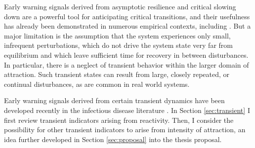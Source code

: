 Early warning signals derived from asymptotic resilience and critical slowing down are a powerful tool for anticipating critical transitions, and their usefulness has already been demonstrated in numerous empirical contexts, including . But a major limitation is the assumption that the system experiences only small, infrequent perturbations, which do not drive the system state very far from equilibrium and which leave sufficient time for recovery in between disturbances. In particular, there is a neglect of transient behavior within the larger domain of attraction. Such transient states can result from large, closely repeated, or continual disturbances, as are common in real world systems.  

Early warning signals derived from certain transient dynamics have been developed recently in the infectious disease literature \cite{oreganTransientIndicatorsTipping2020}. In Section \ref{sec:transient} I first review transient indicators arising from reactivity. Then, I consider the possibility for other transient indicators to arise from intensity of attraction, an idea further developed in Section \ref{sec:proposal} into the thesis proposal. 
























